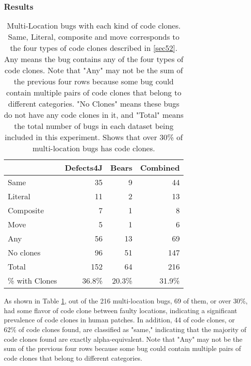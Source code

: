 \documentclass[sigconf, timestamp-false, anonymous=true]{acmart}
\begin{document}
\subsubsection{Results}

\begin{table}
{\begin{center}
\begin{tabular} {lrrr}
\toprule
& Defects4J & Bears & Combined \\
\midrule
Same & 35 & 9 & 44  \\ 
Literal & 11 & 2 & 13  \\
Composite & 7 & 1 & 8  \\
Move & 5 & 1 & 6  \\
\midrule
Any & 56 & 13 & 69  \\
No clones & 96  &  51 & 147 \\
Total & 152 & 64 & 216 \\
\% with Clones & 36.8\% & 20.3\% & 31.9\% \\
\bottomrule
\end{tabular}
\end{center}
}
\caption{Multi-Location bugs with each kind of code clones. 
     Same, Literal, composite and move corresponds to the
    four types of code clones described in \ref{sec52}. Any means the bug
    contains any of the four types of code clones. Note that "Any" may not be
    the sum of the previous four rows because some bug could contain multiple
    pairs of code clones that belong to different categories. "No Clones" means
    these bugs do not have any code clones in it, and "Total" means the total
    number of bugs in each dataset being included in this experiment.
    Shows that over
    30\% of multi-location bugs has code clones.}
\label{tab:clones}
\end{table}

As shown in Table \ref{tab:clones}, out of the 216 multi-location bugs,
69 of them, or over 30\%, had some flavor of code clone between faulty locations, indicating a 
significant 
prevalence of code clones in human patches. In addition, 44 of code clones, or 62\% of code clones 
found, are classified as "same," indicating that the majority of code clones found are exactly 
alpha-equivalent. Note that "Any" may not
be the sum of the previous four rows because some bug could contain multiple pairs of code clones 
that
belong to different categories.
\end{document}
